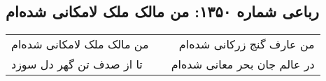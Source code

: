 \begin{center}
\section*{رباعی شماره ۱۳۵۰: من مالک ملک لامکانی شده‌ام}
\label{sec:1350}
\begin{longtable}{l p{0.5cm} r}
من مالک ملک لامکانی شده‌ام
&&
من عارف گنج زرکانی شده‌ام
\\
تا از صدف تن گهر دل سوزد
&&
در عالم جان بحر معانی شده‌ام
\\
\end{longtable}
\end{center}
